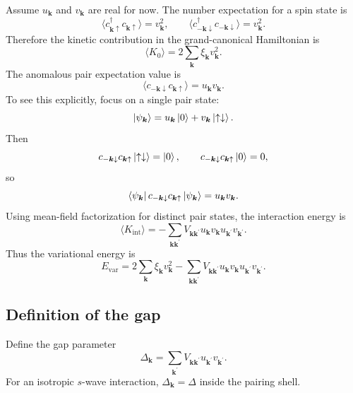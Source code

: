 \documentclass[11pt]{article}
\numberwithin{equation}{section}
\newcommand{\kvec}{\bm{k}}
\newcommand{\kvecp}{\bm{k}^{\prime}}
\begin{document}
Assume $u_{\kvec}$ and $v_{\kvec}$ are real for now. The number expectation for a spin state is
\begin{equation}
\langle c_{\kvec\uparrow}^{\dagger}c_{\kvec\uparrow}\rangle=v_{\kvec}^2,
\qquad
\langle c_{-\kvec\downarrow}^{\dagger}c_{-\kvec\downarrow}\rangle=v_{\kvec}^2.
\end{equation}
Therefore the kinetic contribution in the grand-canonical Hamiltonian is
\begin{equation}
\langle K_0\rangle=2\sum_{\kvec} \xi_{\kvec} v_{\kvec}^2.
\end{equation}
The anomalous pair expectation value is
\begin{equation}
\langle c_{-\kvec\downarrow}c_{\kvec\uparrow}\rangle=u_{\kvec} v_{\kvec}.
\end{equation}
To see this explicitly, focus on a single pair state:
\begin{equation}
\ket{\psi_{\kvec}}=u_{\kvec}\ket{0}+v_{\kvec}\ket{\uparrow\downarrow}.
\end{equation}
Then
\begin{equation}
c_{-\kvec\downarrow}c_{\kvec\uparrow}\ket{\uparrow\downarrow}=\ket{0},
\qquad
c_{-\kvec\downarrow}c_{\kvec\uparrow}\ket{0}=0,
\end{equation}
so
\begin{equation}
\bra{\psi_{\kvec}}c_{-\kvec\downarrow}c_{\kvec\uparrow}\ket{\psi_{\kvec}}=u_{\kvec} v_{\kvec}.
\end{equation}
Using mean-field factorization for distinct pair states, the interaction energy is
\begin{equation}
\langle K_{\mathrm{int}}\rangle=-\sum_{\kvec\kvecp}V_{\kvec\kvecp}u_{\kvec} v_{\kvec} u_{\kvecp}v_{\kvecp}.
\end{equation}
Thus the variational energy is
\begin{equation}
E_{\mathrm{var}}=2\sum_{\kvec}\xi_{\kvec} v_{\kvec}^2-\sum_{\kvec\kvecp}V_{\kvec\kvecp}u_{\kvec} v_{\kvec} u_{\kvecp}v_{\kvecp}.
\label{eq:var_energy}
\end{equation}

\subsection{Definition of the gap}

Define the gap parameter
\begin{equation}
\Delta_{\kvec}=\sum_{\kvecp}V_{\kvec\kvecp}u_{\kvecp}v_{\kvecp}.
\label{eq:gap_definition}
\end{equation}
For an isotropic $s$-wave interaction, $\Delta_{\kvec}=\Delta$ inside the pairing shell.
\end{document}

